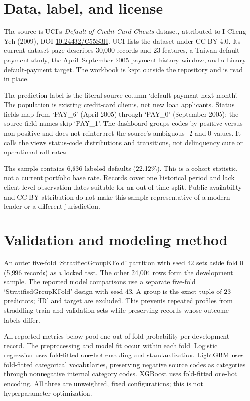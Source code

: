 \documentclass[11pt,letterpaper]{article}
\begin{document}
\section{Data, label, and license}
The source is UCI's \emph{Default of Credit Card Clients} dataset, attributed to I-Cheng Yeh (2009), DOI \href{https://doi.org/10.24432/C55S3H}{10.24432/C55S3H}. UCI lists the dataset under CC BY 4.0. Its current dataset page describes 30,000 records and 23 features, a Taiwan default-payment study, the April--September 2005 payment-history window, and a binary default-payment target. The workbook is kept outside the repository and is read in place.

The prediction label is the literal source column `default payment next month'. The population is existing credit-card clients, not new loan applicants. Status fields map from `PAY\_6' (April 2005) through `PAY\_0' (September 2005); the source field names skip `PAY\_1'. The dashboard groups codes by positive versus non-positive and does not reinterpret the source's ambiguous -2 and 0 values. It calls the views status-code distributions and transitions, not delinquency cure or operational roll rates.

The sample contains 6,636 labeled defaults (22.12\%). This is a cohort statistic, not a current portfolio base rate. Records cover one historical period and lack client-level observation dates suitable for an out-of-time split. Public availability and CC BY attribution do not make this sample representative of a modern lender or a different jurisdiction.

\section{Validation and modeling method}
An outer five-fold `StratifiedGroupKFold' partition with seed 42 sets aside fold 0 (5,996 records) as a locked test. The other 24,004 rows form the development sample. The reported model comparisons use a separate five-fold `StratifiedGroupKFold' design with seed 43. A group is the exact tuple of 23 predictors; `ID' and target are excluded. This prevents repeated profiles from straddling train and validation sets while preserving records whose outcome labels differ.

All reported metrics below pool one out-of-fold probability per development record. The preprocessing and model fit occur within each fold. Logistic regression uses fold-fitted one-hot encoding and standardization. LightGBM uses fold-fitted categorical vocabularies, preserving negative source codes as categories through nonnegative internal category codes. XGBoost uses fold-fitted one-hot encoding. All three are unweighted, fixed configurations; this is not hyperparameter optimization.
\end{document}
